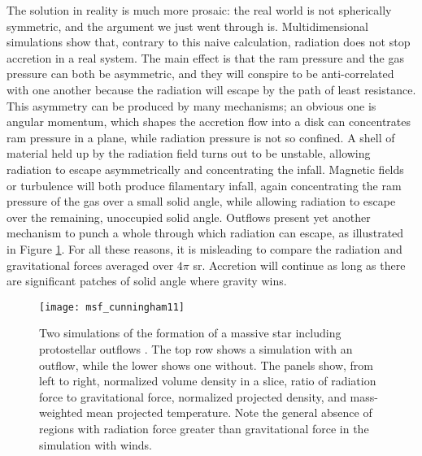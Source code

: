 The solution in reality is much more prosaic: the real world is not spherically symmetric, and the argument we just went through is. Multidimensional simulations show that, contrary to this naive calculation, radiation does not stop accretion in a real system. The main effect is that the ram pressure and the gas pressure can both be asymmetric, and they will conspire to be anti-correlated with one another because the radiation will escape by the path of least resistance. This asymmetry can be produced by many mechanisms; an obvious one is angular momentum, which shapes the accretion flow into a disk can concentrates ram pressure in a plane, while radiation pressure is not so confined. A shell of material held up by the radiation field turns out to be unstable, allowing radiation to escape asymmetrically and concentrating the infall. Magnetic fields or turbulence will both produce filamentary infall, again concentrating the ram pressure of the gas over a small solid angle, while allowing radiation to escape over the remaining, unoccupied solid angle. Outflows present yet another mechanism to punch a whole through which radiation can escape, as illustrated in Figure \ref{fig:msf_cunningham11}. For all these reasons, it is misleading to compare the radiation and gravitational forces averaged over $4\pi$ sr. Accretion will continue as long as there are significant patches of solid angle where gravity wins.

\begin{figure}
\texttt{[image: msf\_cunningham11]}
\caption[Simulation of massive star formation with outflows]{
\label{fig:msf_cunningham11}
Two simulations of the formation of a massive star including protostellar outflows \citep{cunningham11a}. The top row shows a simulation with an outflow, while the lower shows one without. The panels show, from left to right, normalized volume density in a slice, ratio of radiation force to gravitational force, normalized projected density, and mass-weighted mean projected temperature. Note the general absence of regions with radiation force greater than gravitational force in the simulation with winds.
}
\end{figure}

